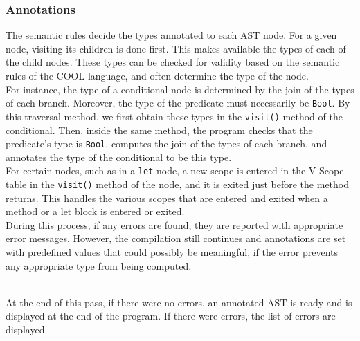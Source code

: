 \documentclass{article}
\begin{document}
\subsubsection*{Annotations}
The semantic rules decide the types annotated to each AST node. For a given node, visiting its children is done first. This makes available the types of each of the child nodes. These types can be checked for validity based on the semantic rules of the COOL language, and often determine the type of the node.
\\
For instance, the type of a conditional node is determined by the join of the types of each branch. Moreover, the type of the predicate must necessarily be \verb|Bool|. By this traversal method, we first obtain these types in the \verb|visit()| method of the conditional. Then, inside the same method, the program checks that the predicate's type is \verb|Bool|, computes the join of the types of each branch, and annotates the type of the conditional to be this type.
\\
For certain nodes, such as in a \verb|let| node, a new scope is entered in the V-Scope table in the \verb|visit()| method of the node, and it is exited just before the method returns. This handles the various scopes that are entered and exited when a method or a let block is entered or exited.
\\
During this process, if any errors are found, they are reported with appropriate error messages. However, the compilation still continues and annotations are set with predefined values that could possibly be meaningful, if the error prevents any appropriate type from being computed.

~\\
At the end of this pass, if there were no errors, an annotated AST is ready and is displayed at the end of the program. If there were errors, the list of errors are displayed.
\end{document}
